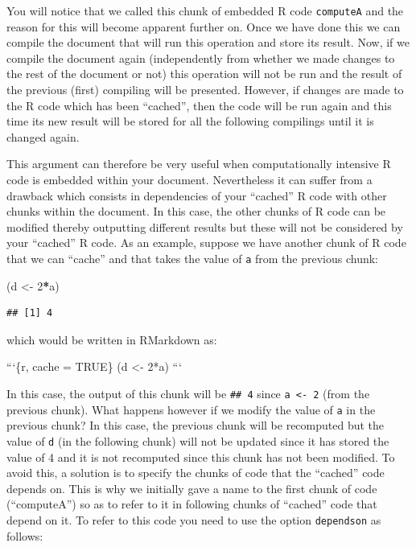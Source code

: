 \documentclass[12pt,]{krantz}
\newenvironment{Shaded}{\begin{snugshade}}{\end{snugshade}}
\newcommand{\DataTypeTok}[1]{\textcolor[rgb]{0.27,0.27,0.27}{#1}}
\newcommand{\DecValTok}[1]{\textcolor[rgb]{0.06,0.06,0.06}{#1}}
\newcommand{\StringTok}[1]{\textcolor[rgb]{0.5,0.5,0.5}{#1}}
\newcommand{\OperatorTok}[1]{\textcolor[rgb]{0.43,0.43,0.43}{\textbf{#1}}}
\newcommand{\NormalTok}[1]{#1}
\begin{document}
You will notice that we called this chunk of embedded R code
\texttt{computeA} and the reason for this will become apparent further
on. Once we have done this we can compile the document that will run
this operation and store its result. Now, if we compile the document
again (independently from whether we made changes to the rest of the
document or not) this operation will not be run and the result of the
previous (first) compiling will be presented. However, if changes are
made to the R code which has been ``cached'', then the code will be run
again and this time its new result will be stored for all the following
compilings until it is changed again.

This argument can therefore be very useful when computationally
intensive R code is embedded within your document. Nevertheless it can
suffer from a drawback which consists in dependencies of your ``cached''
R code with other chunks within the document. In this case, the other
chunks of R code can be modified thereby outputting different results
but these will not be considered by your ``cached'' R code. As an
example, suppose we have another chunk of R code that we can ``cache''
and that takes the value of \texttt{a} from the previous chunk:

\begin{Shaded}
\begin{Highlighting}[]
\NormalTok{(d <-}\StringTok{ }\DecValTok{2}\OperatorTok{*}\NormalTok{a)}
\end{Highlighting}
\end{Shaded}

\begin{verbatim}
## [1] 4
\end{verbatim}

which would be written in RMarkdown as:

\begin{Shaded}
\begin{Highlighting}[]
\StringTok{```}\DataTypeTok{\{r, cache = TRUE\}}
\DataTypeTok{(d <- 2*a)}
\StringTok{```}
\end{Highlighting}
\end{Shaded}

In this case, the output of this chunk will be \texttt{\#\#\ 4} since
\texttt{a\ \textless{}-\ 2} (from the previous chunk). What happens
however if we modify the value of \texttt{a} in the previous chunk? In
this case, the previous chunk will be recomputed but the value of
\texttt{d} (in the following chunk) will not be updated since it has
stored the value of 4 and it is not recomputed since this chunk has not
been modified. To avoid this, a solution is to specify the chunks of
code that the ``cached'' code depends on. This is why we initially gave
a name to the first chunk of code (``computeA'') so as to refer to it in
following chunks of ``cached'' code that depend on it. To refer to this
code you need to use the option \texttt{dependson} as follows:
\end{document}
